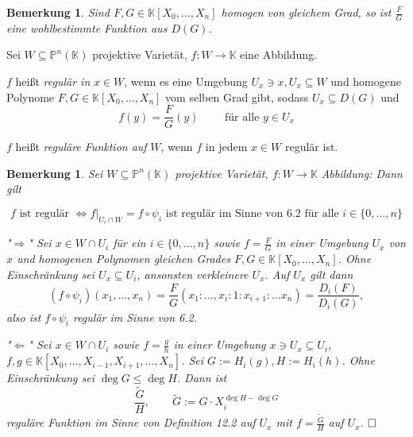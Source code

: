 \documentclass[11pt]{book}
\newtheorem{remark}[theorem]{Bemerkung}
\theoremstyle{nonumberbreak}
\newenvironment{defin}[1][]{\ifthenelse{\equal{#1}{}}{\definition}{\definition[#1]}\rm}{\enddefinition}
\newenvironment{pr}[1][]{\ifthenelse{\equal{#1}{}}{\proof}{\proof[#1]}\rm}{\endproof}
\begin{document}
\begin{spacing}{1.3}
\begin{remark} %
Sind $F,G \in \mathbb{K}[X_0, \ldots, X_n]$ homogen von gleichem Grad, so ist $\frac{F}{G}$ eine wohlbestimmte Funktion aus $D(G)$.
\end{remark}

\begin{defin} %

Sei $W \subseteq \mathbb{P}^n(\mathbb{K})$ projektive Varietät, $f: W \longrightarrow \mathbb{K}$ eine Abbildung.
\begin{compactenum}
\item $f$ heißt \textit{regulär in} $x\in W$, wenn es eine Umgebung $U_x \ni x, U_x \subseteq W$ und homogene Polynome $F,G \in \mathbb{K}[X_0, \ldots, X_n]$ vom selben Grad gibt, sodass $U_x \subseteq D(G)$ und 
$$f(y)= \frac{F}{G}(y) \qquad \textrm{ für alle } y \in U_x$$
\item $f$ heißt \textit{reguläre Funktion auf} $W$, wenn $f$ in jedem $x \in W$ regulär ist.
\end{compactenum}
\end{defin}

\begin{remark} %
Sei $W \subseteq \mathbb{P}^n(\mathbb{K})$ projektive Varietät, $f: W \longrightarrow \mathbb{K}$ Abbildung: Dann gilt

$$f \textrm{ ist regulär } \Longleftrightarrow f \vert _{U_i \cap W} = f \circ \psi_i \textrm{ ist regulär im Sinne von 6.2 für alle } i \in \{0, \ldots, n \}$$
\begin{pr}
\begin{compactenum}
\item["$\Rightarrow$"] Sei $x \in W \cap U_i$ für ein $i \in \{0, \ldots, n \}$ sowie $f= \frac{F}{G}$ in einer Umgebung $U_x$ von $x$ und homogenen Polynomen gleichen Grades $F,G \in \mathbb{K}[X_0, \ldots, X_n]$. Ohne Einschränkung sei $U_x \subseteq U_i$, ansonsten verkleinere $U_x$. Auf $U_x$ gilt dann
$$(f \circ \psi_i)(x_1, \ldots, x_n) = \frac{F}{G} (x_1: \ldots, x_i : 1 : x_{i+1}: \ldots x_n) = \frac{D_i(F)}{D_i(G)},$$
also ist $f \circ \psi_i$ regulär im Sinne von 6.2.
\item["$\Leftarrow$"] Sei $x \in W \cap U_i$ sowie $f = \frac{g}{h}$ in einer Umgebung $x \ni U_x \subseteq U_i$, $f,g \in \mathbb{K}[X_0, \ldots, X_{i-1}, X_{i+1}, \ldots, X_n]$. Sei $G:= H_i(g), H:=H_i(h)$. Ohne Einschränkung sei $\deg G \leqslant \deg H$. Dann ist $$\frac{\tilde{G}}{H}, \qquad \tilde{G} := G \cdot X_i^{\deg H - \deg G}$$
reguläre Funktion im Sinne von Definition 12.2 auf $U_x$ mit $f= \frac{\tilde{G}}{H}$ auf $U_x$. $\hfill \Box$
\end{compactenum}
\end{pr}
\end{remark}


\end{spacing}
\end{document}
